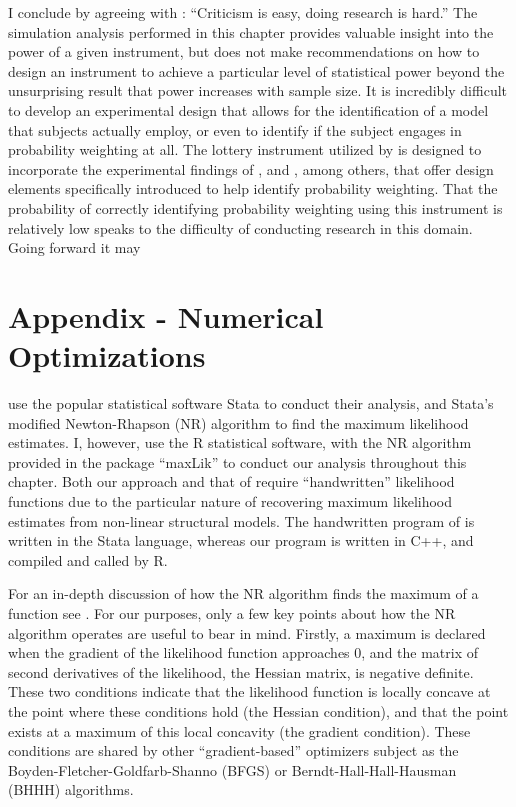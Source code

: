 \documentclass[../main.tex]{subfiles}
\begin{document}
I conclude by agreeing with \textcite[14]{Gelman2013}: \enquote{Criticism is easy, doing research is hard.}
The simulation analysis performed in this chapter provides valuable insight into the power of a given instrument, but does not make recommendations on how to design an instrument to achieve a particular level of statistical power beyond the unsurprising result that power increases with sample size.
It is incredibly difficult to develop an experimental design that allows for the identification of a model that subjects actually employ, or even to identify if the subject engages in probability weighting at all.
The lottery instrument utilized by \textcite[98-99]{Harrison2016} is designed to incorporate the experimental findings of \textcite{Camerer1989}, \textcite{Harless1992} and \textcite{Loomes1998}, among others, that offer design elements specifically introduced to help identify probability weighting.
That the probability of correctly identifying probability weighting using this instrument is relatively low speaks to the difficulty of conducting research in this domain.
Going forward it may 



\break
\section{Appendix - Numerical Optimizations}

\textcite{Harrison2016} use the popular statistical software Stata to conduct their analysis, and Stata's modified Newton-Rhapson (NR) algorithm to find the maximum likelihood estimates.
I, however, use the R statistical software, with the NR algorithm provided in the package \enquote{maxLik} to conduct our analysis throughout this chapter.
Both our approach and that of \textcite{Harrison2016} require \enquote{handwritten} likelihood functions due to the particular nature of recovering maximum likelihood estimates from non-linear structural models.
The handwritten program of \textcite{Harrison2016} is written in the Stata language, whereas our program is written in C++, and compiled and called by R.

For an in-depth discussion of how the NR algorithm finds the maximum of a function see \textcite[213-219]{Train2002}.
For our purposes, only a few key points about how the NR algorithm operates are useful to bear in mind.
Firstly, a maximum is declared when the gradient of the likelihood function approaches 0, and the matrix of second derivatives of the likelihood, the Hessian matrix, is negative definite.
These two conditions indicate that the likelihood function is locally concave at the point where these conditions hold (the Hessian condition), and that the point exists at a maximum of this local concavity (the gradient condition).
These conditions are shared by other \enquote{gradient-based} optimizers subject as the Boyden-Fletcher-Goldfarb-Shanno (BFGS) or Berndt-Hall-Hall-Hausman (BHHH) algorithms.
\end{document}
